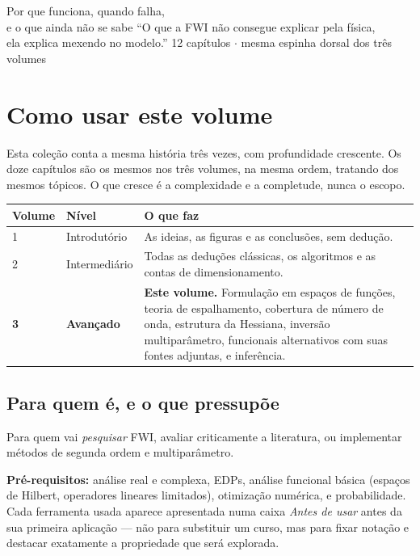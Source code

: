 \documentclass[11pt,a4paper,oneside]{report}
\begin{document}
\capafwi
{Por que funciona, quando falha,\\e o que ainda n\~ao se sabe}
{``O que a FWI n\~ao consegue explicar pela f\'isica,\\ela explica mexendo no
modelo.''}
{12 cap\'itulos $\cdot$ mesma espinha dorsal dos tr\^es volumes}

\tableofcontents
\cleardoublepage

\chapter*{Como usar este volume}

Esta cole\c{c}\~ao conta a mesma hist\'oria tr\^es vezes, com profundidade
crescente. Os doze cap\'itulos s\~ao os mesmos nos tr\^es volumes, na mesma
ordem, tratando dos mesmos t\'opicos. O que cresce \'e a complexidade e a
completude, nunca o escopo.

\begin{center}
\begin{tabular}{@{}llp{7.4cm}@{}}
\toprule
\textbf{Volume} & \textbf{N\'ivel} & \textbf{O que faz} \\
\midrule
1 & Introdut\'orio & As ideias, as figuras e as conclus\~oes, sem
dedu\c{c}\~ao. \\
2 & Intermedi\'ario & Todas as dedu\c{c}\~oes cl\'assicas, os algoritmos e as
contas de dimensionamento. \\
\textbf{3} & \textbf{Avan\c{c}ado} & \textbf{Este volume.} Formula\c{c}\~ao em
espa\c{c}os de fun\c{c}\~oes, teoria de espalhamento, cobertura de
n\'umero de onda, estrutura da Hessiana, invers\~ao multipar\^ametro,
funcionais alternativos com suas fontes adjuntas, e infer\^encia. \\
\bottomrule
\end{tabular}
\end{center}

\section*{Para quem \'e, e o que pressup\~oe}

Para quem vai \emph{pesquisar} FWI, avaliar criticamente a literatura, ou
implementar m\'etodos de segunda ordem e multipar\^ametro.

\textbf{Pr\'e-requisitos:} an\'alise real e complexa, EDPs, an\'alise
funcional b\'asica (espa\c{c}os de Hilbert, operadores lineares limitados),
otimiza\c{c}\~ao num\'erica, e probabilidade. Cada ferramenta usada aparece
apresentada numa caixa \emph{Antes de usar} antes da sua primeira
aplica\c{c}\~ao --- n\~ao para substituir um curso, mas para fixar
nota\c{c}\~ao e destacar exatamente a propriedade que ser\'a explorada.
\end{document}
